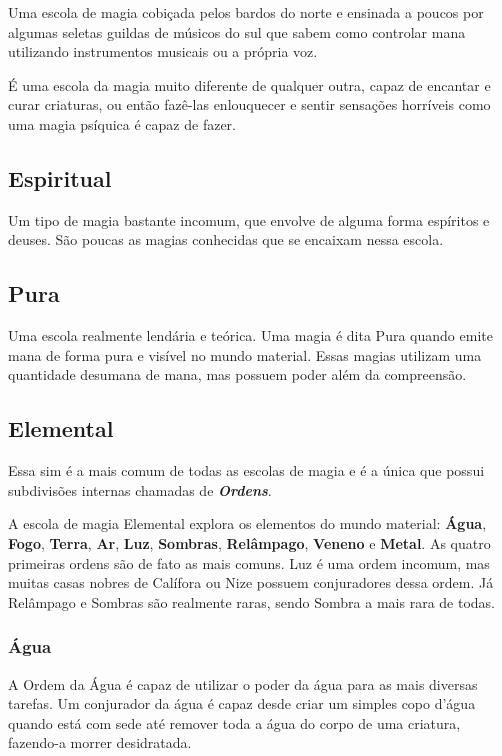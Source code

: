\begin{multicols}{2}
Uma escola de magia cobiçada pelos bardos do norte e ensinada a poucos por
algumas seletas guildas de músicos do sul que sabem como controlar mana
utilizando instrumentos musicais ou a própria voz.

É uma escola da magia muito diferente de qualquer outra, capaz de encantar e
curar criaturas, ou então fazê-las enlouquecer e sentir sensações horríveis como
uma magia psíquica é capaz de fazer.

\subsection*{Espiritual}%

Um tipo de magia bastante incomum, que envolve de alguma forma espíritos e
deuses. São poucas as magias conhecidas que se encaixam nessa escola.

\subsection*{Pura}%

Uma escola realmente lendária e teórica. Uma magia é dita Pura quando emite mana
de forma pura e visível no mundo material. Essas magias utilizam uma quantidade
desumana de mana, mas possuem poder além da compreensão.

\subsection*{Elemental}%

Essa sim é a mais comum de todas as escolas de magia e é a única que possui
subdivisões internas chamadas de \textit{\textbf{Ordens}}.

A escola de magia Elemental explora os elementos do mundo material:
\textbf{Água}, \textbf{Fogo}, \textbf{Terra}, \textbf{Ar}, \textbf{Luz},
\textbf{Sombras}, \textbf{Relâmpago}, \textbf{Veneno} e \textbf{Metal}. As
quatro primeiras ordens são de fato as mais comuns. Luz é uma ordem incomum, mas
muitas casas nobres de Calífora ou Nize possuem conjuradores dessa ordem. Já
Relâmpago e Sombras são realmente raras, sendo Sombra a mais rara de todas.

\subsubsection{Água}%

A Ordem da Água é capaz de utilizar o poder da água para as mais diversas
tarefas. Um conjurador da água é capaz desde criar um simples copo d'água quando
está com sede até remover toda a água do corpo de uma criatura, fazendo-a morrer
desidratada.


\end{multicols}
